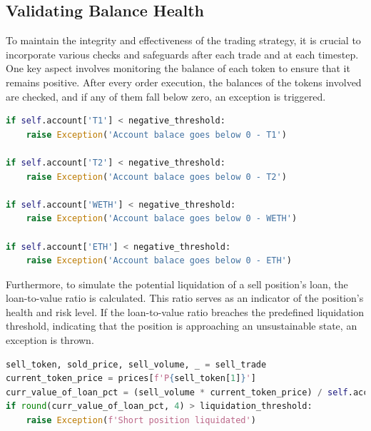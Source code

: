 \subsection{Validating Balance Health}
To maintain the integrity and effectiveness of the trading strategy, it is crucial to incorporate various checks and safeguards after each trade and at each timestep. One key aspect involves monitoring the balance of each token to ensure that it remains positive. After every order execution, the balances of the tokens involved are checked, and if any of them fall below zero, an exception is triggered.
\vspace{5mm}
\begin{lstlisting}[language=Python]
if self.account['T1'] < negative_threshold:
    raise Exception('Account balace goes below 0 - T1')

if self.account['T2'] < negative_threshold:
    raise Exception('Account balace goes below 0 - T2')

if self.account['WETH'] < negative_threshold:
    raise Exception('Account balace goes below 0 - WETH')

if self.account['ETH'] < negative_threshold:
    raise Exception('Account balace goes below 0 - ETH')
\end{lstlisting}
\vspace{5mm}    
Furthermore, to simulate the potential liquidation of a sell position's loan, the loan-to-value ratio is calculated. This ratio serves as an indicator of the position's health and risk level. If the loan-to-value ratio breaches the predefined liquidation threshold, indicating that the position is approaching an unsustainable state, an exception is thrown.
\vspace{5mm}
\begin{lstlisting}[language=Python]
sell_token, sold_price, sell_volume, _ = sell_trade
current_token_price = prices[f'P{sell_token[1]}']
curr_value_of_loan_pct = (sell_volume * current_token_price) / self.account['collateral_WETH']
if round(curr_value_of_loan_pct, 4) > liquidation_threshold:
    raise Exception(f'Short position liquidated')
\end{lstlisting}

